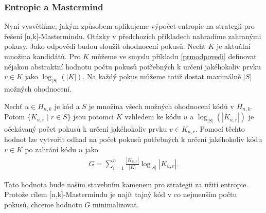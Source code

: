 \subsubsection{Entropie a Mastermind}
Nyní vysvětlíme, jakým způsobem aplikujeme výpočet entropie na strategii pro řešení [n,k]-Mastermindu. Otázky v předchozích příkladech nahradíme zahranými pokusy. Jako odpovědi budou sloužit ohodnocení pokusů. Nechť $K$ je aktuální množina kandidátů. Pro $K$ můžeme ve smyslu příkladu \ref{prmodpovedi} definovat nějakou abstraktní hodnotu počtu pokusů potřebných k určení jakéhokoliv prvku  $v \in K$ jako $\log_{|S|}(|K|)$. Na každý pokus můžeme totiž dostat maximálně $|S|$ možných ohodnocení. 

Nechť $u \in H_{n,k}$ je kód a $S$ je množina všech možných ohodnocení kódů v $H_{n,k}$. Potom $\{K_{u,r} \mid r\in S\}$ jsou potomci $K$ vzhledem ke kódu $u$ a $\log_{|S|}(|K_{u,r}|)$ je očekávaný počet pokusů k určení jakéhokoliv prvku $v \in K_{u,r}$. Pomocí těchto hodnot lze vytvořit odhad na počet pokusů potřebných k určení jakéhokoliv kódu $v \in K$ po zahrání kódu $u$ jako 
\begin{align}\label{rceocekavanypocetpokusu}
    G = \sum_{i=1}^n \frac{|K_{u,r}|}{|K|}\log_{|S|}|K_{u,r}|.
\end{align}



Tato hodnota bude naším stavebním kamenem pro strategii za užití entropie. Protože cílem [n,k]-Mastermindu je najít tajný kód v co nejmenším počtu pokusů, chceme hodnotu $G$ minimalizovat. 



